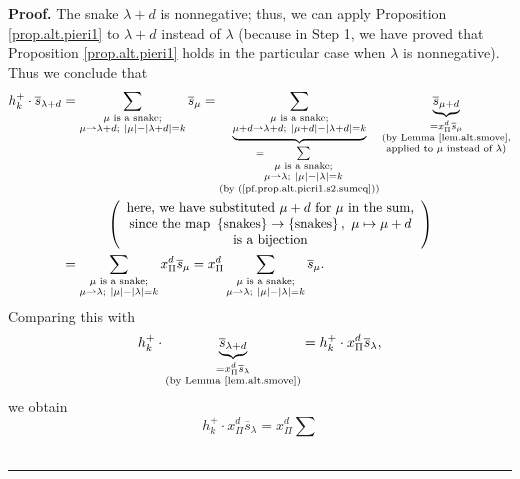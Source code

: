 \documentclass[numbers=enddot,12pt,final,onecolumn,notitlepage]{scrartcl}%
\theoremstyle{definition}
\newenvironment{proof}[1][Proof]{\noindent\textbf{#1.} }{\ \rule{0.5em}{0.5em}}
\let\sumnonlimits\sum
\renewcommand{\sum}{\sumnonlimits\limits}
\begin{document}
\begin{proof}
The snake $\lambda+d$ is nonnegative; thus, we can apply Proposition
\ref{prop.alt.pieri1} to $\lambda+d$ instead of $\lambda$ (because in Step 1,
we have proved that Proposition \ref{prop.alt.pieri1} holds in the particular
case when $\lambda$ is nonnegative). Thus we conclude that
\begin{align*}
h_{k}^{+}\cdot\overline{s}_{\lambda+d}  &  =\sum_{\substack{\mu\text{ is a
snake;}\\\mu\rightharpoonup\lambda+d;\ \left\vert \mu\right\vert -\left\vert
\lambda+d\right\vert =k}}\overline{s}_{\mu}=\underbrace{\sum_{\substack{\mu
\text{ is a snake;}\\\mu+d\rightharpoonup\lambda+d;\ \left\vert \mu
+d\right\vert -\left\vert \lambda+d\right\vert =k}}}_{\substack{=\sum
_{\substack{\mu\text{ is a snake;}\\\mu\rightharpoonup\lambda;\ \left\vert
\mu\right\vert -\left\vert \lambda\right\vert =k}}\\\text{(by
(\ref{pf.prop.alt.pieri1.s2.sumeq}))}}}\underbrace{\overline{s}_{\mu+d}%
}_{\substack{=x_{\Pi}^{d}\overline{s}_{\mu}\\\text{(by Lemma
\ref{lem.alt.smove},}\\\text{applied to }\mu\text{ instead of }\lambda
\text{)}}}\\
&  \ \ \ \ \ \ \ \ \ \ \left(
\begin{array}
[c]{c}%
\text{here, we have substituted }\mu+d\text{ for }\mu\text{ in the sum,}\\
\text{since the map }\left\{  \text{snakes}\right\}  \rightarrow\left\{
\text{snakes}\right\}  ,\ \mu\mapsto\mu+d\\
\text{is a bijection}%
\end{array}
\right) \\
&  =\sum_{\substack{\mu\text{ is a snake;}\\\mu\rightharpoonup\lambda
;\ \left\vert \mu\right\vert -\left\vert \lambda\right\vert =k}}x_{\Pi}%
^{d}\overline{s}_{\mu}=x_{\Pi}^{d}\sum_{\substack{\mu\text{ is a snake;}%
\\\mu\rightharpoonup\lambda;\ \left\vert \mu\right\vert -\left\vert
\lambda\right\vert =k}}\overline{s}_{\mu}.
\end{align*}
Comparing this with%
\[
h_{k}^{+}\cdot\underbrace{\overline{s}_{\lambda+d}}_{\substack{=x_{\Pi}%
^{d}\overline{s}_{\lambda}\\\text{(by Lemma \ref{lem.alt.smove})}}}=h_{k}%
^{+}\cdot x_{\Pi}^{d}\overline{s}_{\lambda},
\]
we obtain%
\[
h_{k}^{+}\cdot x_{\Pi}^{d}\overline{s}_{\lambda}=x_{\Pi}^{d}\sum
\]
\end{proof}
\end{document}
